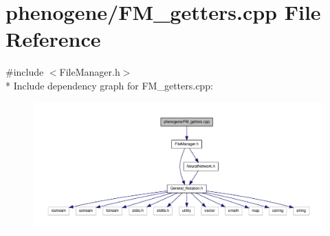 \hypertarget{a00006}{\section{phenogene/\-F\-M\-\_\-getters.cpp File Reference}
\label{de/d21/a00006}
}
{\ttfamily \#include $<$File\-Manager.\-h$>$}\\*
Include dependency graph for F\-M\-\_\-getters.\-cpp\-:
\nopagebreak
\begin{figure}[H]
\begin{center}
\leavevmode
\includegraphics[width=350pt]{dc/de2/a00024}
\end{center}
\end{figure}

